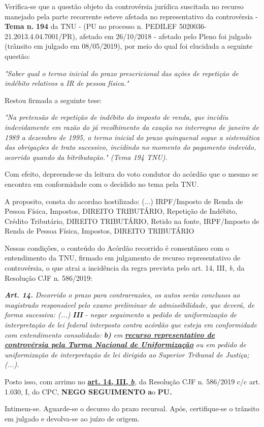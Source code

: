 \documentclass[12pt]{article}
\begin{document}
\justifying
\noindent Verifica-se que a questão objeto da controvérsia jurídica suscitada no recurso manejado pela parte recorrente esteve afetada no representativo da controvérsia - \textbf{Tema n. }\textbf{194} da TNU - (PU no processo n. PEDILEF 5020036-21.2013.4.04.7001/PR),  afetado em 26/10/2018 - afetado pelo Pleno foi julgado (trânsito em julgado em 08/05/2019), por meio do qual foi elucidada a seguinte questão:

\noindent \textit{"Saber qual o termo inicial do prazo prescricional das ações de repetição de indébito relativos a IR de pessoa física."}

\noindent Restou firmada a seguinte tese:

\noindent \textit{"Na pretensão de repetição de indébito do imposto de renda, que incidiu indevidamente em razão do já recolhimento da exação no interregno de janeiro de 1989 a dezembro de 1995, o termo inicial do prazo quinquenal segue a sistemática das obrigações de trato sucessivo, incidindo no momento do pagamento indevido, ocorrido quando da bitributação." (Tema 194 TNU).}

\noindent Com efeito, depreende-se da leitura do voto condutor do acórdão que o mesmo se encontra em conformidade com o decidido no  tema pela TNU.

\noindent A proposito, consta do acordao hostilizado: (...) IRPF/Imposto de Renda de Pessoa Física, Impostos, DIREITO TRIBUTÁRIO, Repetição de Indébito, Crédito Tributário, DIREITO TRIBUTÁRIO, Retido na fonte, IRPF/Imposto de Renda de Pessoa Física, Impostos, DIREITO TRIBUTÁRIO

\noindent Nessas condições, o conteúdo do Acórdão recorrido é consentâneo com o entendimento da TNU, firmado em julgamento de recurso representativo de controvérsia, o que atrai a incidência da regra prevista pelo art. 14, III, \textit{b,} da Resolução CJF n. 586/2019:

\noindent \textit{\textbf{Art. 14.}}\textit{ Decorrido o prazo para contrarrazões, os autos serão conclusos ao magistrado responsável pelo exame preliminar de admissibilidade, que deverá, de forma sucessiva: (...) }\textit{\textbf{III }}\textit{- negar seguimento a pedido de uniformização de interpretação de lei federal interposto contra acórdão que esteja em conformidade com entendimento consolidado: }\textit{\textbf{b)}}\textit{ em }\uline{\textit{\textbf{recurso representativo de controvérsia pela Turma Nacional de Uniformização}}}\textit{ ou em pedido de uniformização de interpretação de lei dirigido ao Superior Tribunal de Justiça;(...).}

\noindent Posto isso, com arrimo no \uline{\textbf{art. 14, III, }}\uline{\textit{\textbf{b}}}\textit{,} da Resolução CJF n. 586/2019 c/c art. 1.030, I, do CPC, \textbf{NEGO SEGUIMENTO }\textbf{a}o\textbf{ PU}\textbf{.}

\noindent Intimem-se. Aguarde-se o decurso do prazo recursal. Após, certifique-se o trânsito em julgado e devolva-se ao juízo de origem.
\end{document}
